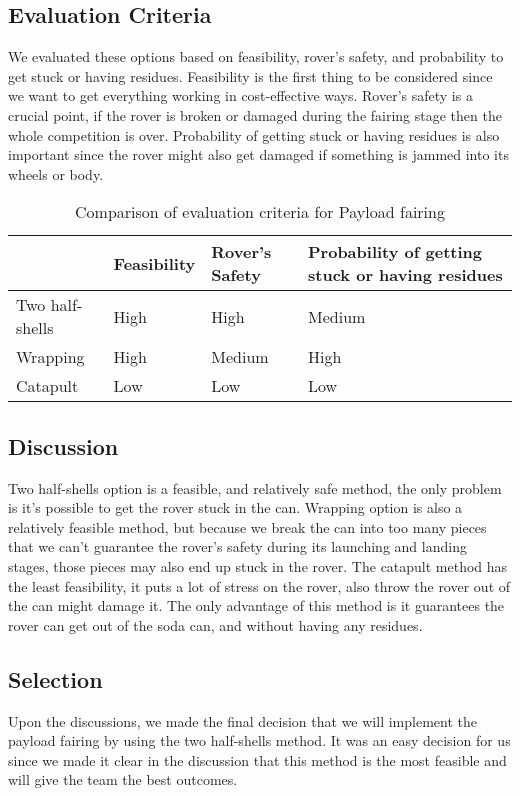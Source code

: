\documentclass[10pt,serif,draftclsnofoot,onecolumn]{IEEEtran}
\begin{document}
\subsection{Evaluation Criteria}
We evaluated these options based on feasibility, rover's safety, and probability to get stuck or having residues. Feasibility is the first thing to be considered since we want to get everything working in cost-effective ways. Rover's safety is a crucial point, if the rover is broken or damaged during the fairing stage then the whole competition is over. Probability of getting stuck or having residues is also important since the rover might also get damaged if something is jammed into its wheels or body. 


\begin{table}[h!]
  \centering
  \caption{Comparison of evaluation criteria for Payload fairing}
  \label{tab:table1}
  \begin{tabular}{l|l|l|l}
                          & Feasibility & Rover's Safety & Probability of getting stuck or having residues \\
    \hline
    Two half-shells       & High & High       & Medium  \\
    \hline
    Wrapping		      & High  &  Medium   & High \\
    \hline
    Catapult			  & Low  & Low  & Low  \\
  \end{tabular}
\end{table}

\subsection{Discussion}
Two half-shells option is a feasible, and relatively safe method, the only problem is it's possible to get the rover stuck in the can. Wrapping option is also a relatively feasible method, but because we break the can into too many pieces that we can't guarantee the rover's safety during its launching and landing stages, those pieces may also end up stuck in the rover. The catapult method has the least feasibility, it puts a lot of stress on the rover, also throw the rover out of the can might damage it. The only advantage of this method is it guarantees the rover can get out of the soda can, and without having any residues.  

\subsection{Selection}
Upon the discussions, we made the final decision that we will implement the payload fairing by using the two half-shells method. It was an easy decision for us since we made it clear in the discussion that this method is the most feasible and will give the team the best outcomes. 


\newpage
\end{document}
